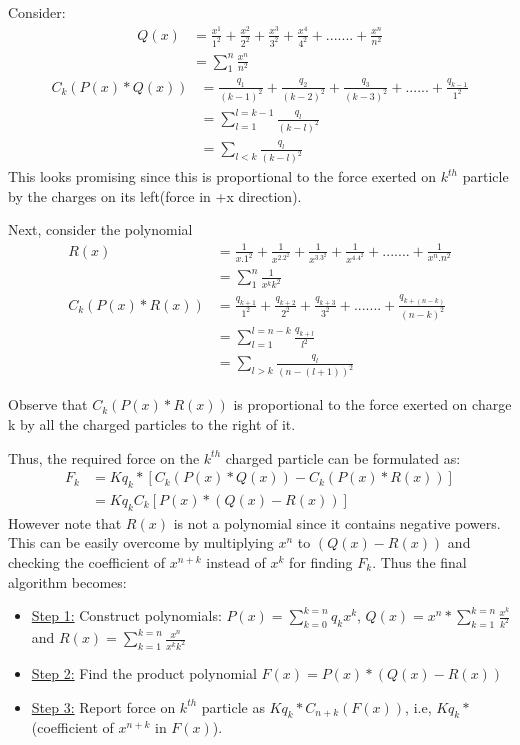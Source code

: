 \documentclass{article}
\begin{document}
Consider:
\begin{align*}
	Q(x) &= \frac{x^1}{1^2} + \frac{x^2}{2^2} + \frac{x^3}{3^2} + \frac{x^4}{4^2} + ....... + \frac{x^n}{n^2} \\
		&= \sum_{1}^{n} \frac{x^n}{n^2}
\end{align*}
\begin{align*}
	C_k(P(x) * Q(x)) &= \frac{q_1}{(k-1)^2} + \frac{q_2}{(k-2)^2} + \frac{q_3}{(k-3)^2} + ...... + \frac{q_{k-1}}{1^2}\\
	&= \sum_{l=1}^{l=k-1} \frac{q_l}{(k-l)^2}\\
	&= \sum_{l < k} \frac{q_l}{(k-l)^2}
\end{align*}
This looks promising since this is proportional to the force exerted on $k^{th}$ particle by the charges on its left(force in +x direction).
\par
Next, consider the polynomial
\begin{align*}
	R(x) &= \frac{1}{x.1^2} + \frac{1}{x^2.2^2} + \frac{1}{x^3.3^2} + \frac{1}{x^4.4^2} + ....... + \frac{1}{x^n.n^2}\\
	&= \sum_{1}^{n} \frac{1}{x^kk^2}\\
	C_k(P(x) * R(x)) &= \frac{q_{k+1}}{1^2} +  \frac{q_{k+2}}{2^2} + \frac{q_{k+3}}{3^2} + ....... + \frac{q_{k+(n - k)}}{(n-k)^2}\\
	&= \sum_{l = 1}^{l = n - k} \frac{q_{k+l}}{l^2}\\
	&= \sum_{l > k}\frac{q_l}{(n - (l+1))^2}
\end{align*}

\par
Observe that $C_k(P(x) * R(x))$ is proportional to the force exerted on charge k by all the charged particles to the right of it.

Thus, the required force on the $k^{th}$ charged particle can be formulated as:
\begin{align*}
F_k &= Kq_k * [C_k(P(x) * Q(x)) - C_k(P(x) * R(x))]\\
&= Kq_k C_k [P(x) * (Q(x) - R(x))]
\end{align*}
However note that $R(x)$ is not a polynomial since it contains negative powers. This can be easily overcome by multiplying $x^n$ to $(Q(x) - R(x))$ and checking the coefficient of $x^{n+k}$ instead of $x^k$ for finding $F_k$.
Thus the final algorithm becomes:
\begin{itemize}
	\item \underline{Step 1:} Construct polynomials: $P(x) = \sum_{k=0}^{k=n}q_kx^k$, 
	$Q(x) = x^n * \sum_{k=1}^{k=n} \frac{x^k}{k^2}$ and $R(x) = \sum_{k=1}^{k=n} \frac{x^n}{x^kk^2}$
	\item \underline{Step 2:} Find the product polynomial $F(x) = P(x) * (Q(x) - R(x))$
	\item \underline{Step 3:} Report force on $k^{th}$ particle as $Kq_k * C_{n+k}(F(x))$, i.e, $Kq_k *$ (coefficient of $x^{n+k}$ in $F(x)$).
\end{itemize}
\end{document}
